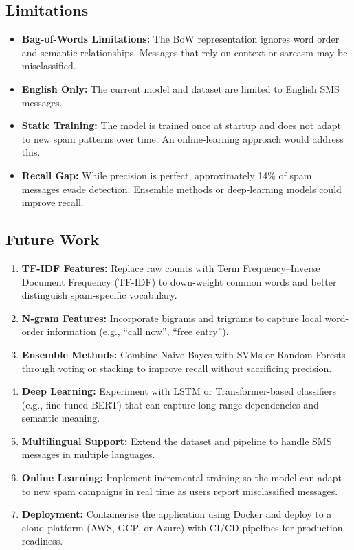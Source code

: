 \documentclass[paper=a4, fontsize=11pt]{scrartcl}
\numberwithin{equation}{section}
\numberwithin{figure}{section}
\numberwithin{table}{section}
\begin{document}
\subsection{Limitations}
\begin{itemize}
    \item \textbf{Bag-of-Words Limitations:} The BoW representation ignores word order and semantic relationships.  Messages that rely on context or sarcasm may be misclassified.
    \item \textbf{English Only:} The current model and dataset are limited to English SMS messages.
    \item \textbf{Static Training:} The model is trained once at startup and does not adapt to new spam patterns over time.  An online-learning approach would address this.
    \item \textbf{Recall Gap:} While precision is perfect, approximately 14\% of spam messages evade detection.  Ensemble methods or deep-learning models could improve recall.
\end{itemize}

\subsection{Future Work}
\begin{enumerate}
    \item \textbf{TF-IDF Features:} Replace raw counts with Term Frequency–Inverse Document Frequency (TF-IDF) to down-weight common words and better distinguish spam-specific vocabulary.
    \item \textbf{N-gram Features:} Incorporate bigrams and trigrams to capture local word-order information (e.g., ``call now'', ``free entry'').
    \item \textbf{Ensemble Methods:} Combine Naive Bayes with SVMs or Random Forests through voting or stacking to improve recall without sacrificing precision.
    \item \textbf{Deep Learning:} Experiment with LSTM or Transformer-based classifiers (e.g., fine-tuned BERT) that can capture long-range dependencies and semantic meaning.
    \item \textbf{Multilingual Support:} Extend the dataset and pipeline to handle SMS messages in multiple languages.
    \item \textbf{Online Learning:} Implement incremental training so the model can adapt to new spam campaigns in real time as users report misclassified messages.
    \item \textbf{Deployment:} Containerise the application using Docker and deploy to a cloud platform (AWS, GCP, or Azure) with CI/CD pipelines for production readiness.
\end{enumerate}
\end{document}
